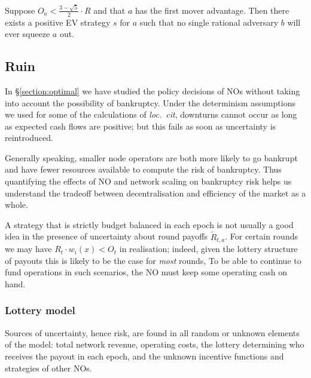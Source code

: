 \begin{proposition}
  
  Suppose $O_a< \frac{3-\sqrt {5}}{2} \cdot R$ and that $a$ has the first mover advantage.
  Then there exists a positive EV strategy $s$ for $a$ such that no single rational adversary $b$ will ever squeeze $a$ out.

\end{proposition}



\subsection{Ruin}
\label{section:risk}

In \S\ref{section:optimal} we have studied the policy decisions of NOs without taking into account the possibility of bankruptcy.
%
Under the determinism assumptions we used for some of the calculations of \emph{loc.~cit}, downturns cannot occur as long as expected cash flows are positive; but this fails as soon as uncertainty is reintroduced.

Generally speaking, smaller node operators are both more likely to go bankrupt and have fewer resources available to compute the risk of bankruptcy.
%
Thus quantifying the effects of NO and network scaling on bankruptcy risk helps us understand the tradeoff between decentralisation and efficiency of the market as a whole.


\begin{example}

  A strategy that is strictly budget balanced in each epoch is not usually a good idea in the presence of uncertainty about round payoffs $\tilde{R}_{t,a}$.
  For certain rounds we may have $R_t\cdot w_i(x) < O_t$ in realisation; indeed, given the lottery structure of payouts this is likely to be the case for \emph{most} rounds,
  To be able to continue to fund operations in such scenarios, the NO must keep some operating cash on hand.

\end{example}

\subsubsection{Lottery model}

Sources of uncertainty, hence risk, are found in all random or unknown elements of the model: total network revenue, operating costs, the lottery determining who receives the payout in each epoch, and the unknown incentive functions and strategies of other NOs.

